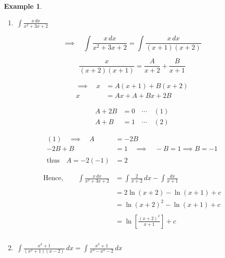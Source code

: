\documentclass[11pt,a4paper]{article}
\theoremstyle{definition}
\newtheorem{example}[thm]{Example}
\begin{document}
\begin{example}

\begin{enumerate}
\item $\,\displaystyle{\int \frac{x\,dx}{x^2 + 3x + 2}}$

$$\implies \quad  \int \frac{x\,dx}{x^2 + 3x + 2} = \int \frac{x\,dx}{\left( x + 1\right)\left( x + 2\right)}$$

$$\frac{x}{\left(x + 2\right)\left(x + 1\right)} = \frac{A}{x + 2} + \frac{B}{x + 1}$$


\begin{align*}
\implies\quad  x & = A(x+1) + B(x+ 2)\\
x & = Ax + A + Bx + 2B
\end{align*}


\begin{align*}
A + 2B & = 0\quad  \cdots\quad  (1)\\
A + B & = 1\quad  \cdots\quad  (2)
\end{align*}


\begin{align*}
(1)\quad  \implies\quad  A & = -2B\\
-2B + B & = 1\quad  \implies\quad  -B = 1\implies B = -1\\\\
\text{thus}\quad  A = -2(-1) & = 2
\end{align*}





\begin{align*}
\text{Hence},\qquad  \int \frac{x\,dx}{x^2 + 3x + 2} & = \int \frac{2}{x + 2} \,dx - \int \frac{dx}{x + 1}\\\\
& = 2\ln \left( x + 2\right) - \ln \left(x + 1\right) + c\\
& = \ln \left(x + 2\right)^2 - \ln \left(x + 1\right) + c\\\\
& = \ln \left[\frac{\left(x + 2\right)^2}{x + 1}\right] + c\\\\
\end{align*}




\item $\, \displaystyle{\int \frac{x^3 + 1}{\left(x^2 + 1\right)\left(x - 2\right)}\,dx = \int \frac{x^3 + 1}{x^3 - x^2 - 2}\,dx}$\\\\




\end{enumerate}
\end{example}
\end{document}
